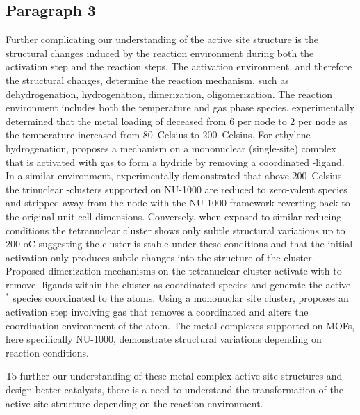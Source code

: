 \documentclass[journal=jctcce,manuscript=article]{achemso}
\begin{document}
\subsection{Paragraph 3}
Further complicating our understanding of the active site structure is the structural changes induced  by the reaction environment during both the activation step and the reaction steps. The activation environment, and therefore the structural changes, determine the reaction mechanism, such as dehydrogenation, hydrogenation, dimerization, oligomerization. The reaction environment includes both the temperature and gas phase species. \citeauthor{Kim2015} experimentally determined that the metal loading of  deceased from  6  per node to 2  per node as the temperature increased from \SI{80}{Celsius} to \SI{200}{Celsius}.\cite{Kim2015} For ethylene hydrogenation, \citeauthor{Li2016sintering} proposes a mechanism on a mononuclear (single-site)  complex that is activated with  gas to form a  hydride by removing a coordinated -ligand.\cite{Li2016sintering} In a similar  environment, \citeauthor{Halder2020} experimentally demonstrated that above \SI{200}{Celsius} the trinuclear -clusters supported on NU-1000 are reduced to zero-valent  species and stripped away from the node with the NU-1000 framework reverting back to the original unit cell dimensions.\cite{Halder2020} Conversely, when exposed to similar reducing conditions the tetranuclear  cluster shows only subtle structural variations up to 200 oC\cite{PlateroPrats2017} suggesting the cluster is stable under these conditions and that the initial activation only produces subtle changes into the structure of the cluster. Proposed dimerization mechanisms on the tetranuclear  cluster activate with  to remove -ligands within the cluster as coordinated  species and generate the active $^*$ species coordinated to the  atoms.\cite{Ye2017} Using a mononuclar site  cluster, \citeauthor{Li2017} proposes an activation step involving  gas that removes a coordinated  and alters the coordination environment of the  atom. The metal complexes supported on MOFs, here specifically NU-1000, demonstrate structural variations depending on reaction conditions. 



To further our understanding of these metal complex active site structures and design better catalysts, there is a need to understand the transformation of the active site structure depending on the reaction environment. 
\end{document}

